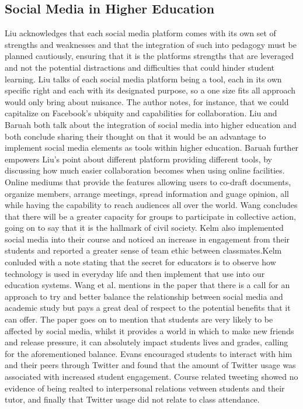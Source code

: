 \documentclass[lettersize,journal]{IEEEtran}
\begin{document}
\subsection{Social Media in Higher Education}
Liu \cite{Liu2010}  acknowledges that each social media platform comes with its own set of strengths and weaknesses and that the integration of such into pedagogy must be planned cautiously, ensuring that it is the platforms strengths that are leveraged and not the potential distractions and difficulties that could hinder student learning. Liu talks of each social media platform being a tool, each in its own specific right and each with its designated purpose, so a one size fits all approach would only bring about nuisance. The author notes, for instance, that we could capitalize on Facebook's ubiquity and capabilities for collaboration.
Liu \cite{Liu2010} and Baruah \cite{Baruah2012} both talk about the integration of social media into higher education and both conclude sharing their thought on that it would be an advantage to implement social media elements as tools within higher education. Baruah further empowers Liu's point about different platform providing different tools, by discussing how much easier collaboration becomes when using online facilities. Online mediums that provide the features allowing users to co-draft documents, organize members, arrange meetings, spread information and guage opinion, all while having the capability to reach audiences all over the world.
Wang concludes that there will be a greater capacity for groups to participate in collective action, going on to say that it is the hallmark of civil society.
Kelm \cite{Kelm2011} also implemented social media into their course and noticed an increase in engagement from their students and reported a greater sense of team ethic between classmates.Kelm conluded with a note stating that the secret for educators is to observe how technology is used in everyday life and then implement that use into our education systems.
Wang et al. \cite{Wang2011}  mentions in the paper that there is a call for an approach to try and better balance the relationship between social media and academic study but pays a great deal of respect to the potential benefits that it can offer. The paper goes on to mention that students are very likely to be affected by social media, whilst it provides a world in which to make new friends and release pressure, it can absolutely impact students lives and grades, calling for the aforementioned balance.
Evans \cite{Evans2014} encouraged students to interact with him and their peers through Twitter and found that the amount of Twitter usage was associated with increased student engagement. Course related tweeting showed no evidence of being realted to interpersonal relations vetween students and their tutor, and finally that Twitter usage did not relate to class attendance.
\end{document}
